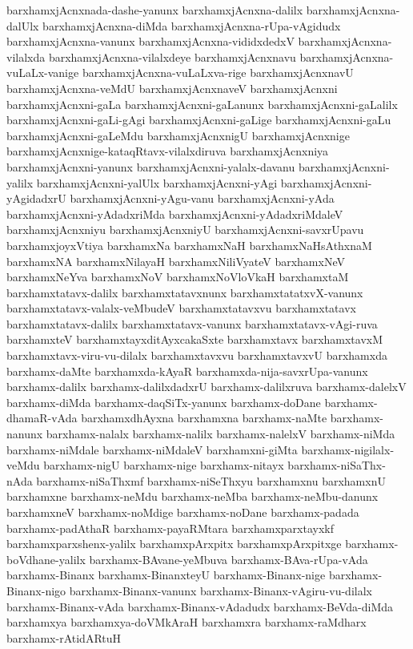 {barxhamxjAcnxnada-dashe-yanunx
barxhamxjAcnxna-dalilx
barxhamxjAcnxna-dalUlx
barxhamxjAcnxna-diMda
barxhamxjAcnxna-rUpa-vAgidudx
barxhamxjAcnxna-vanunx
barxhamxjAcnxna-vididxdedxV
barxhamxjAcnxna-vilalxda
barxhamxjAcnxna-vilalxdeye
barxhamxjAcnxnavu
barxhamxjAcnxna-vuLaLx-vanige
barxhamxjAcnxna-vuLaLxva-rige
barxhamxjAcnxnavU
barxhamxjAcnxna-veMdU
barxhamxjAcnxnaveV
barxhamxjAcnxni
barxhamxjAcnxni-gaLa
barxhamxjAcnxni-gaLanunx
barxhamxjAcnxni-gaLalilx
barxhamxjAcnxni-gaLi-gAgi
barxhamxjAcnxni-gaLige
barxhamxjAcnxni-gaLu
barxhamxjAcnxni-gaLeMdu
barxhamxjAcnxnigU
barxhamxjAcnxnige
barxhamxjAcnxnige-kataqRtavx-vilalxdiruva
barxhamxjAcnxniya
barxhamxjAcnxni-yanunx
barxhamxjAcnxni-yalalx-davanu
barxhamxjAcnxni-yalilx
barxhamxjAcnxni-yalUlx
barxhamxjAcnxni-yAgi
barxhamxjAcnxni-yAgidadxrU
barxhamxjAcnxni-yAgu-vanu
barxhamxjAcnxni-yAda
barxhamxjAcnxni-yAdadxriMda
barxhamxjAcnxni-yAdadxriMdaleV
barxhamxjAcnxniyu
barxhamxjAcnxniyU
barxhamxjAcnxni-savxrUpavu
barxhamxjoyxVtiya
barxhamxNa
barxhamxNaH
barxhamxNaHsAthxnaM
barxhamxNA
barxhamxNilayaH
barxhamxNiliVyateV
barxhamxNeV
barxhamxNeYva
barxhamxNoV
barxhamxNoVloVkaH
barxhamxtaM
barxhamxtatavx-dalilx
barxhamxtatavxnunx
barxhamxtatatxvX-vanunx
barxhamxtatavx-valalx-veMbudeV
barxhamxtatavxvu
barxhamxtatavx
barxhamxtatavx-dalilx
barxhamxtatavx-vanunx
barxhamxtatavx-vAgi-ruva
barxhamxteV
barxhamxtayxditAyxcakaSxte
barxhamxtavx
barxhamxtavxM
barxhamxtavx-viru-vu-dilalx
barxhamxtavxvu
barxhamxtavxvU
barxhamxda
barxhamx-daMte
barxhamxda-kAyaR
barxhamxda-nija-savxrUpa-vanunx
barxhamx-dalilx
barxhamx-dalilxdadxrU
barxhamx-dalilxruva
barxhamx-dalelxV
barxhamx-diMda
barxhamx-daqSiTx-yanunx
barxhamx-doDane
barxhamx-dhamaR-vAda
barxhamxdhAyxna
barxhamxna
barxhamx-naMte
barxhamx-nanunx
barxhamx-nalalx
barxhamx-nalilx
barxhamx-nalelxV
barxhamx-niMda
barxhamx-niMdale
barxhamx-niMdaleV
barxhamxni-giMta
barxhamx-nigilalx-veMdu
barxhamx-nigU
barxhamx-nige
barxhamx-nitayx
barxhamx-niSaThx-nAda
barxhamx-niSaThxmf
barxhamx-niSeThxyu
barxhamxnu
barxhamxnU
barxhamxne
barxhamx-neMdu
barxhamx-neMba
barxhamx-neMbu-danunx
barxhamxneV
barxhamx-noMdige
barxhamx-noDane
barxhamx-padada
barxhamx-padAthaR
barxhamx-payaRMtara
barxhamxparxtayxkf
barxhamxparxshenx-yalilx
barxhamxpArxpitx
barxhamxpArxpitxge
barxhamx-boVdhane-yalilx
barxhamx-BAvane-yeMbuva
barxhamx-BAva-rUpa-vAda
barxhamx-Binanx
barxhamx-BinanxteyU
barxhamx-Binanx-nige
barxhamx-Binanx-nigo
barxhamx-Binanx-vanunx
barxhamx-Binanx-vAgiru-vu-dilalx
barxhamx-Binanx-vAda
barxhamx-Binanx-vAdadudx
barxhamx-BeVda-diMda
barxhamxya
barxhamxya-doVMkAraH
barxhamxra
barxhamx-raMdharx
barxhamx-rAtidARtuH
}
